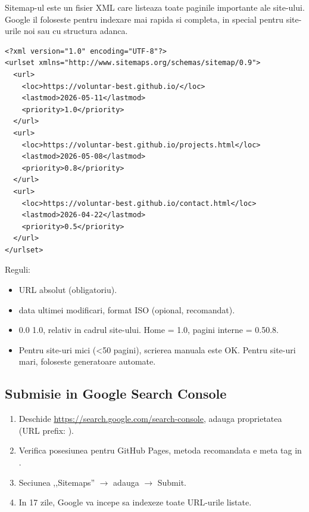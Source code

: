 Sitemap-ul este un fisier XML care listeaza toate paginile importante ale site-ului. Google il foloseste pentru indexare mai rapida si completa, in special pentru site-urile noi sau cu structura adanca.

\begin{lstlisting}[caption={\texttt{sitemap.xml} scris manual pentru un portofoliu mic}, basicstyle=\ttfamily\small, backgroundcolor=\color{codeBg}, frame=leftline, framerule=2.5pt, rulecolor=\color{partcolor}, framexleftmargin=4pt, xleftmargin=14pt]
<?xml version="1.0" encoding="UTF-8"?>
<urlset xmlns="http://www.sitemaps.org/schemas/sitemap/0.9">
  <url>
    <loc>https://voluntar-best.github.io/</loc>
    <lastmod>2026-05-11</lastmod>
    <priority>1.0</priority>
  </url>
  <url>
    <loc>https://voluntar-best.github.io/projects.html</loc>
    <lastmod>2026-05-08</lastmod>
    <priority>0.8</priority>
  </url>
  <url>
    <loc>https://voluntar-best.github.io/contact.html</loc>
    <lastmod>2026-04-22</lastmod>
    <priority>0.5</priority>
  </url>
</urlset>
\end{lstlisting}

Reguli:
\begin{itemize}[itemsep=1pt]
  \item {} \textendash{} URL absolut (obligatoriu).
  \item {} \textendash{} data ultimei modificari, format ISO  (opional, recomandat).
  \item {} \textendash{} 0.0 \textendash{} 1.0, relativ in cadrul site-ului. Home = 1.0, pagini interne = 0.5\textendash{}0.8.
  \item Pentru site-uri mici (\textless{}50 pagini), scrierea manuala este OK. Pentru site-uri mari, foloseste generatoare automate.
\end{itemize}

\subsection{Submisie in Google Search Console}

\begin{enumerate}[itemsep=1pt]
  \item Deschide \url{https://search.google.com/search-console}, adauga proprietatea (URL prefix: ).
  \item Verifica posesiunea \textendash{} pentru GitHub Pages, metoda recomandata e meta tag in .
  \item Seciunea ,,Sitemaps'' $\to$ adauga  $\to$ Submit.
  \item In 1\textendash{}7 zile, Google va incepe sa indexeze toate URL-urile listate.
\end{enumerate}

